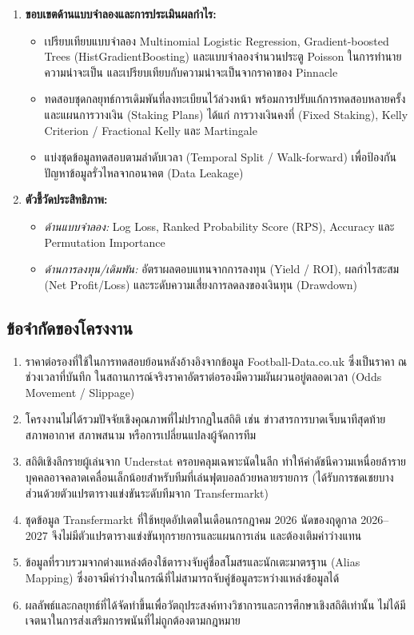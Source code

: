 \begin{enumerate}[label=\arabic*)]
    \item \textbf{ขอบเขตด้านแบบจำลองและการประเมินผลกำไร:}
    \begin{itemize}[labelindent=0pt]
        \item เปรียบเทียบแบบจำลอง Multinomial Logistic Regression, Gradient-boosted Trees (HistGradientBoosting) และแบบจำลองจำนวนประตู Poisson ในการทำนายความน่าจะเป็น และเปรียบเทียบกับความน่าจะเป็นจากราคาของ Pinnacle
        \item ทดสอบชุดกลยุทธ์การเดิมพันที่ลงทะเบียนไว้ล่วงหน้า พร้อมการปรับแก้การทดสอบหลายครั้ง และแผนการวางเงิน (Staking Plans) ได้แก่ การวางเงินคงที่ (Fixed Staking), Kelly Criterion / Fractional Kelly และ Martingale
        \item แบ่งชุดข้อมูลทดสอบตามลำดับเวลา (Temporal Split / Walk-forward) เพื่อป้องกันปัญหาข้อมูลรั่วไหลจากอนาคต (Data Leakage)
    \end{itemize}

    \item \textbf{ตัวชี้วัดประสิทธิภาพ:} 
    \begin{itemize}[labelindent=0pt]
        \item \textit{ด้านแบบจำลอง:} Log Loss, Ranked Probability Score (RPS), Accuracy และ Permutation Importance
        \item \textit{ด้านการลงทุน/เดิมพัน:} อัตราผลตอบแทนจากการลงทุน (Yield / ROI), ผลกำไรสะสม (Net Profit/Loss) และระดับความเสี่ยงการลดลงของเงินทุน (Drawdown)
    \end{itemize}
\end{enumerate}

\subsection{ข้อจำกัดของโครงงาน}

\begin{enumerate}[label=\arabic*)]
    \item ราคาต่อรองที่ใช้ในการทดสอบย้อนหลังอ้างอิงจากข้อมูล Football-Data.co.uk ซึ่งเป็นราคา ณ ช่วงเวลาที่บันทึก ในสถานการณ์จริงราคาอัตราต่อรองมีความผันผวนอยู่ตลอดเวลา (Odds Movement / Slippage)
    \item โครงงานไม่ได้รวมปัจจัยเชิงคุณภาพที่ไม่ปรากฏในสถิติ เช่น ข่าวสารการบาดเจ็บนาทีสุดท้าย สภาพอากาศ สภาพสนาม หรือการเปลี่ยนแปลงผู้จัดการทีม
    \item สถิติเชิงลึกรายผู้เล่นจาก Understat ครอบคลุมเฉพาะนัดในลีก ทำให้ค่าดัชนีความเหนื่อยล้ารายบุคคลอาจคลาดเคลื่อนเล็กน้อยสำหรับทีมที่เล่นฟุตบอลถ้วยหลายรายการ (ได้รับการชดเชยบางส่วนด้วยตัวแปรตารางแข่งขันระดับทีมจาก Transfermarkt)
    \item ชุดข้อมูล Transfermarkt ที่ใช้หยุดอัปเดตในเดือนกรกฎาคม 2026 นัดของฤดูกาล 2026--2027 จึงไม่มีตัวแปรตารางแข่งขันทุกรายการและแผนการเล่น และต้องเติมค่าว่างแทน
    \item ข้อมูลที่รวบรวมจากต่างแหล่งต้องใช้ตารางจับคู่ชื่อสโมสรและนักเตะมาตรฐาน (Alias Mapping) ซึ่งอาจมีค่าว่างในกรณีที่ไม่สามารถจับคู่ข้อมูลระหว่างแหล่งข้อมูลได้
    \item ผลลัพธ์และกลยุทธ์ที่ได้จัดทำขึ้นเพื่อวัตถุประสงค์ทางวิชาการและการศึกษาเชิงสถิติเท่านั้น ไม่ได้มีเจตนาในการส่งเสริมการพนันที่ไม่ถูกต้องตามกฎหมาย
\end{enumerate}

